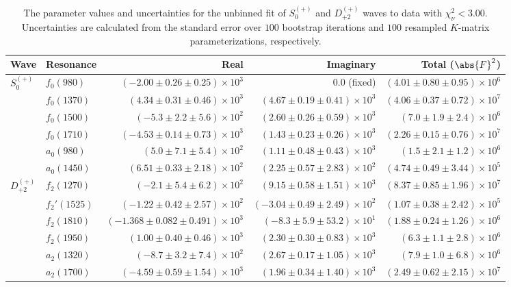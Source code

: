 \begin{table}[ht]
    \begin{center}
        \begin{tabular}{llrrr}\toprule
        Wave & Resonance & Real & Imaginary & Total ($\abs{F}^2$) \\\midrule
$S_{0}^{(+)}$ & $f_{0}(980)$ & $(-2.00 \pm 0.26 \pm 0.25) \times 10^{3}$ & $0.0$ (fixed) & $(4.01 \pm 0.80 \pm 0.95) \times 10^{6}$ \\
 & $f_{0}(1370)$ & $(4.34 \pm 0.31 \pm 0.46) \times 10^{3}$ & $(4.67 \pm 0.19 \pm 0.41) \times 10^{3}$ & $(4.06 \pm 0.37 \pm 0.72) \times 10^{7}$ \\
 & $f_{0}(1500)$ & $(-5.3 \pm 2.2 \pm 5.6) \times 10^{2}$ & $(2.60 \pm 0.26 \pm 0.59) \times 10^{3}$ & $(7.0 \pm 1.9 \pm 2.4) \times 10^{6}$ \\
 & $f_{0}(1710)$ & $(-4.53 \pm 0.14 \pm 0.73) \times 10^{3}$ & $(1.43 \pm 0.23 \pm 0.26) \times 10^{3}$ & $(2.26 \pm 0.15 \pm 0.76) \times 10^{7}$ \\
 & $a_{0}(980)$ & $(5.0 \pm 7.1 \pm 5.4) \times 10^{2}$ & $(1.11 \pm 0.48 \pm 0.43) \times 10^{3}$ & $(1.5 \pm 2.1 \pm 1.2) \times 10^{6}$ \\
 & $a_{0}(1450)$ & $(6.51 \pm 0.33 \pm 2.18) \times 10^{2}$ & $(2.25 \pm 0.57 \pm 2.83) \times 10^{2}$ & $(4.74 \pm 0.49 \pm 3.44) \times 10^{5}$ \\
$D_{+2}^{(+)}$ & $f_{2}(1270)$ & $(-2.1 \pm 5.4 \pm 6.2) \times 10^{2}$ & $(9.15 \pm 0.58 \pm 1.51) \times 10^{3}$ & $(8.37 \pm 0.85 \pm 1.96) \times 10^{7}$ \\
 & $f_{2}'(1525)$ & $(-1.22 \pm 0.42 \pm 2.57) \times 10^{2}$ & $(-3.04 \pm 0.49 \pm 2.49) \times 10^{2}$ & $(1.07 \pm 0.38 \pm 2.42) \times 10^{5}$ \\
 & $f_{2}(1810)$ & $(-1.368 \pm 0.082 \pm 0.491) \times 10^{3}$ & $(-8.3 \pm 5.9 \pm 53.2) \times 10^{1}$ & $(1.88 \pm 0.24 \pm 1.26) \times 10^{6}$ \\
 & $f_{2}(1950)$ & $(1.00 \pm 0.40 \pm 0.46) \times 10^{3}$ & $(2.30 \pm 0.30 \pm 0.83) \times 10^{3}$ & $(6.3 \pm 1.1 \pm 2.8) \times 10^{6}$ \\
 & $a_{2}(1320)$ & $(-8.7 \pm 3.2 \pm 7.4) \times 10^{2}$ & $(2.67 \pm 0.17 \pm 1.05) \times 10^{3}$ & $(7.9 \pm 1.0 \pm 6.8) \times 10^{6}$ \\
 & $a_{2}(1700)$ & $(-4.59 \pm 0.59 \pm 1.54) \times 10^{3}$ & $(1.96 \pm 0.34 \pm 1.40) \times 10^{3}$ & $(2.49 \pm 0.62 \pm 2.15) \times 10^{7}$ \\\bottomrule
        \end{tabular}
    \caption{The parameter values and uncertainties for the unbinned fit of $S_{0}^{(+)}$ and $D_{+2}^{(+)}$ waves to data with $\chi^2_\nu < 3.00$. Uncertainties are calculated from the standard error over $100$ bootstrap iterations and $100$ resampled $K$-matrix parameterizations, respectively.}\label{tab:unbinned-fit-chisqdof-3.0-resampled-Sp0p-Dp2p}
    \end{center}
\end{table}
